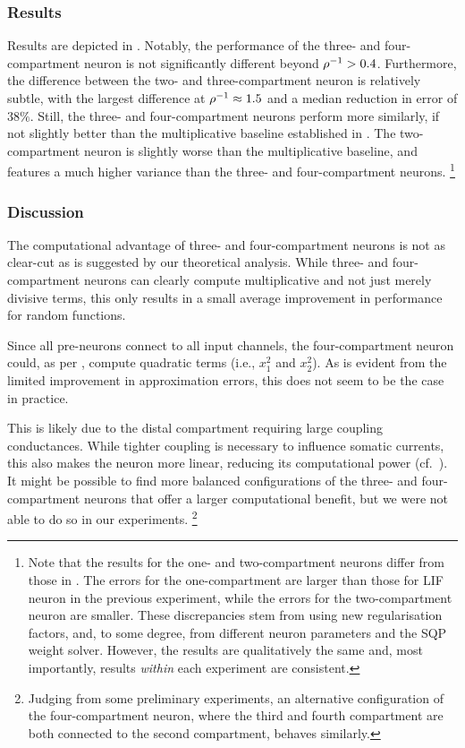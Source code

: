 \subsubsection{Results}
Results are depicted in .
Notably, the performance of the three- and four-compartment neuron is not significantly different beyond ${\rho^{-1}} > 0.4$.
Furthermore, the difference between the two- and three-compartment neuron is relatively subtle, with the largest difference at ${\rho^{-1}} \approx 1.5$ and a median reduction in error of $38\%$.
Still, the three- and four-compartment neurons perform more similarly, if not slightly better than the multiplicative baseline established in .
The two-compartment neuron is slightly worse than the multiplicative baseline, and features a much higher variance than the three- and four-compartment neurons.%
\footnote{Note that the results for the one- and two-compartment neurons differ from those in .
The errors for the one-compartment are larger than those for LIF neuron in the previous experiment, while the errors for the two-compartment neuron are smaller.
These discrepancies stem from using new regularisation factors, and, to some degree, from different neuron parameters and the SQP weight solver.
However, the results are qualitatively the same and, most importantly, results \emph{within} each experiment are consistent.}

\subsubsection{Discussion}
The computational advantage of three- and four-compartment neurons is not as clear-cut as is suggested by our theoretical analysis.
While three- and four-compartment neurons can clearly compute multiplicative and not just merely divisive terms, this only results in a small average improvement in performance for random functions.

Since all pre-neurons connect to all input channels, the four-compartment neuron could, as per , compute quadratic terms (i.e., $x_1^2$ and $x_2^2$).
As is evident from the limited improvement in approximation errors, this does not seem to be the case in practice.

This is likely due to the distal compartment requiring large coupling conductances.
While tighter coupling is necessary to influence somatic currents, this also makes the neuron more linear, reducing its computational power (cf.~).
It might be possible to find more balanced configurations of the three- and four-compartment neurons that offer a larger computational benefit, but we were not able to do so in our experiments.%
\footnote{Judging from some preliminary experiments, an alternative configuration of the four-compartment neuron, where the third and fourth compartment are both connected to the second compartment, behaves similarly.
}

